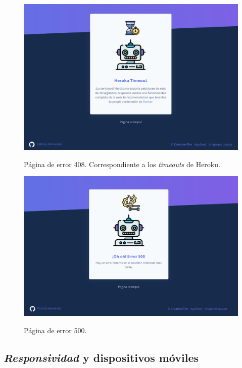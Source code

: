 \begin{figure}[h]
	\caption[Manual de usuario: error 408]{Página de error 408. Correspondiente a los \textit{timeouts} de Heroku.}
	\centering
	\includegraphics[scale=0.27]{../img/anexos/user_guide/0_error_408}
	\label{e-0:error-408}
\end{figure}

\begin{figure}[h]
	\caption[Manual de usuario: error 500]{Página de error 500.}
	\centering
	\includegraphics[scale=0.27]{../img/anexos/user_guide/0_error_500}
	\label{e-0:error-500}
\end{figure}


\subsection{\textit{Responsividad} y dispositivos móviles}

